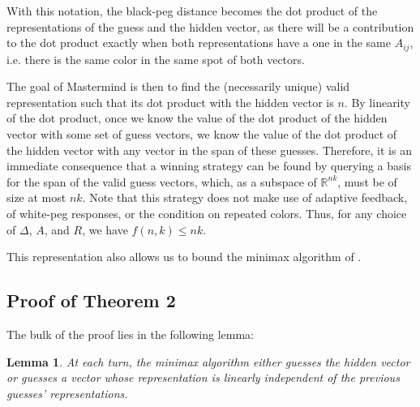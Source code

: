 \documentclass[12pt, a4paper]{article}
\newcommand{\R}{\mathbb{R}}           %
\newtheorem{lemma}{Lemma}
\begin{document}
With this notation, the black-peg distance becomes the dot product of the representations of the guess and the hidden vector, as there will be a contribution to the dot product exactly when both representations have a one in the same $A_{ij}$, i.e. there is the same color in the same spot of both vectors. 

The goal of Mastermind is then to find the (necessarily unique) valid representation such that its dot product with the hidden vector is $n$. By linearity of the dot product, once we know the value of the dot product of the hidden vector with some set of guess vectors, we know the value of the dot product of the hidden vector with any vector in the span of these guesses. Therefore, it is an immediate consequence that a winning strategy can be found by querying a basis for the span of the valid guess vectors, which, as a subspace of $\R^{nk}$, must be of size at most $nk$. Note that this strategy does not make use of adaptive feedback, of white-peg responses, or the condition on repeated colors. Thus, for any choice of $\Delta$, $A$, and $R$, we have $f(n,k) \leq nk$.

This representation also allows us to bound the minimax algorithm of \cite{DK76}. 
\subsection{Proof of Theorem 2}
The bulk of the proof lies in the following lemma:
\begin{lemma}
	At each turn, the minimax algorithm either guesses the hidden vector or guesses a vector whose representation is linearly independent of the previous guesses' representations.
\end{lemma}
\end{document}
